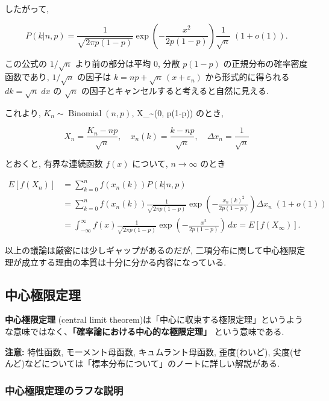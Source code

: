 \documentclass[
  letterpaper,
  DIV=11,
  numbers=noendperiod]{scrartcl}
\begin{document}
したがって,

\[
P(k|n,p) =
\frac{1}{\sqrt{2\pi p(1-p)}}
\exp\left(-\frac{x^2}{2p(1-p)}\right)
\frac{1}{\sqrt{n}}
\;(1 + o(1)).
\]

この公式の \(1/\sqrt{n}\) より前の部分は平均 \(0\), 分散 \(p(1-p)\)
の正規分布の確率密度函数であり, \(1/\sqrt{n}\) の因子は
\(k = np + \sqrt{n}\,(x + \varepsilon_n)\) から形式的に得られる
\(dk = \sqrt{n}\;dx\) の \(\sqrt{n}\)
の因子とキャンセルすると考えると自然に見える.

これより, \(K_n \sim \operatorname{Binomial}(n, p)\),
X\_\infty \sim {}(0, p(1-p)) のとき,

\[
X_n = \frac{K_n - np}{\sqrt{n}}, \quad
x_n(k) = \frac{k - np}{\sqrt{n}}, \quad
\varDelta x_n = \frac{1}{\sqrt{n}}
\]

とおくと, 有界な連続函数 \(f(x)\) について, \(n\to\infty\) のとき

\[
\begin{aligned}
E[f(X_n)] &=
\sum_{k=0}^n f(x_n(k)) P(k|n,p)
\\ &=
\sum_{k=0}^n f(x_n(k))
\frac{1}{\sqrt{2\pi p(1-p)}}
\exp\left(-\frac{x_n(k)^2}{2p(1-p)}\right)
\varDelta x_n \;(1 + o(1))
\\ &=
\int_{-\infty}^\infty f(x)
\frac{1}{\sqrt{2\pi p(1-p)}}
\exp\left(-\frac{x^2}{2p(1-p)}\right)\,dx =
E[f(X_\infty)].
\end{aligned}
\]

以上の議論は厳密には少しギャップがあるのだが,
二項分布に関して中心極限定理が成立する理由の本質は十分に分かる内容になっている.

\hypertarget{ux4e2dux5fc3ux6975ux9650ux5b9aux7406}{%
\subsection{中心極限定理}\label{ux4e2dux5fc3ux6975ux9650ux5b9aux7406}}

\textbf{中心極限定理} (central limit
theorem)は「中心に収束する極限定理」というような意味ではなく、\textbf{「確率論における中心的な極限定理」}
という意味である.

\textbf{注意:} 特性函数, モーメント母函数, キュムラント母函数,
歪度(わいど),
尖度(せんど)などについては「標本分布について」のノートに詳しい解説がある.

\hypertarget{ux4e2dux5fc3ux6975ux9650ux5b9aux7406ux306eux30e9ux30d5ux306aux8aacux660e}{%
\subsubsection{中心極限定理のラフな説明}\label{ux4e2dux5fc3ux6975ux9650ux5b9aux7406ux306eux30e9ux30d5ux306aux8aacux660e}}
\end{document}
